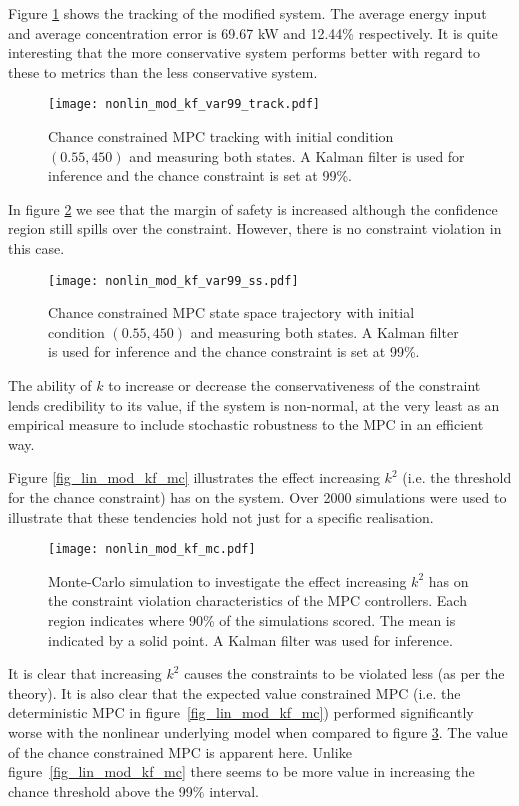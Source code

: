 Figure \ref{fig_nonlin_mod_kf_var99_track} shows the tracking of the modified system. The average energy input and average concentration error is 69.67 kW and 12.44\% respectively. It is quite interesting that the more conservative system performs better with regard to these to metrics than the less conservative system.
\begin{figure}[H] 
\centering
\texttt{[image: nonlin\_mod\_kf\_var99\_track.pdf]}
\caption{Chance constrained MPC tracking with initial condition $(0.55, 450)$ and measuring both states. A Kalman filter is used for inference and the chance constraint is set at 99\%.}
\label{fig_nonlin_mod_kf_var99_track}
\end{figure}
In figure \ref{fig_nonlin_mod_kf_var99_ss} we see that the margin of safety is increased although the confidence region still spills over the constraint. However, there is no constraint violation in this case.
\begin{figure}[H] 
\centering
\texttt{[image: nonlin\_mod\_kf\_var99\_ss.pdf]}
\caption{Chance constrained MPC state space trajectory with initial condition $(0.55, 450)$ and measuring both states. A Kalman filter is used for inference and the chance constraint is set at 99\%.}
\label{fig_nonlin_mod_kf_var99_ss}
\end{figure}
The ability of $k$ to increase or decrease the conservativeness of the constraint lends credibility to its value, if the system is non-normal, at the very least as an empirical measure to include stochastic robustness to the MPC in an efficient way.

Figure \ref{fig_lin_mod_kf_mc} illustrates the effect increasing $k^2$ (i.e. the threshold for the chance constraint) has on the system. Over 2000 simulations were used to illustrate that these tendencies hold not just for a specific realisation. 
\begin{figure}[H] 
\centering
\texttt{[image: nonlin\_mod\_kf\_mc.pdf]}
\caption{Monte-Carlo simulation to investigate the effect increasing $k^2$ has on the constraint violation characteristics of the MPC controllers. Each region indicates where 90\% of the simulations scored. The mean is indicated by a solid point. A Kalman filter was used for inference.}
\label{fig_nonlin_mod_kf_mc}
\end{figure}
It is clear that increasing $k^2$ causes the constraints to be violated less (as per the theory). It is also clear that the expected value constrained MPC (i.e. the deterministic MPC in figure~\ref{fig_lin_mod_kf_mc}) performed significantly worse with the nonlinear underlying model when compared to figure \ref{fig_nonlin_mod_kf_mc}. The value of the chance constrained MPC is apparent here. Unlike figure~\ref{fig_lin_mod_kf_mc} there seems to be more value in increasing the chance threshold above the 99\% interval.

